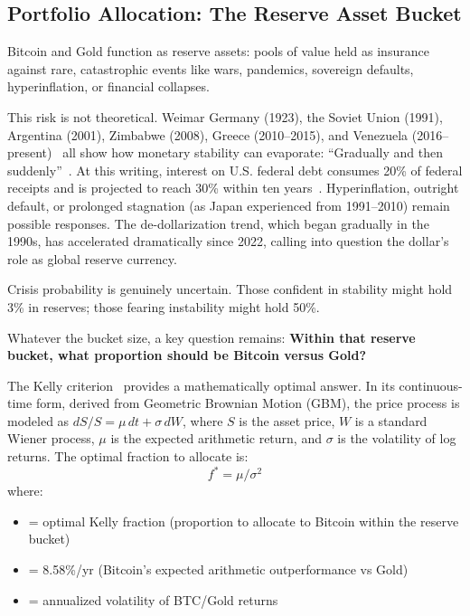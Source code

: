 \documentclass[11pt,letterpaper]{article}
\begin{document}
\subsection{Portfolio Allocation: The Reserve Asset Bucket}

Bitcoin and Gold function as reserve assets: pools of value held as insurance against rare, catastrophic events like wars, pandemics, sovereign defaults, hyperinflation, or financial collapses.

This risk is not theoretical. Weimar Germany (1923), the Soviet Union (1991), Argentina (2001), Zimbabwe (2008), Greece (2010--2015), and Venezuela (2016--present)~\cite{reinhart2009} all show how monetary stability can evaporate: ``Gradually and then suddenly''~\cite{hemingway1926}. At this writing, interest on U.S. federal debt consumes 20\% of federal receipts and is projected to reach 30\% within ten years~\cite{cbo2024}. Hyperinflation, outright default, or prolonged stagnation (as Japan experienced from 1991--2010) remain possible responses. The de-dollarization trend, which began gradually in the 1990s, has accelerated dramatically since 2022, calling into question the dollar's role as global reserve currency.

Crisis probability is genuinely uncertain. Those confident in stability might hold 3\% in reserves; those fearing instability might hold 50\%.

Whatever the bucket size, a key question remains: \textbf{Within that reserve bucket, what proportion should be Bitcoin versus Gold?}

The Kelly criterion~\cite{kelly1956} provides a mathematically optimal answer. In its continuous-time form, derived from Geometric Brownian Motion (GBM), the price process is modeled as $dS/S = \mu\,dt + \sigma\,dW$, where $S$ is the asset price, $W$ is a standard Wiener process, $\mu$ is the expected arithmetic return, and $\sigma$ is the volatility of log returns. The optimal fraction to allocate is:
\begin{equation}
f^* = \mu / \sigma^2
\label{eq:kelly}
\end{equation}
where:
\begin{itemize}[leftmargin=2cm]
    \item[$f^*$] = optimal Kelly fraction (proportion to allocate to Bitcoin within the reserve bucket)
    \item[$\mu$] = 8.58\%/yr (Bitcoin's expected arithmetic outperformance vs Gold)
    \item[$\sigma$] = annualized volatility of BTC/Gold returns
\end{itemize}
\end{document}
